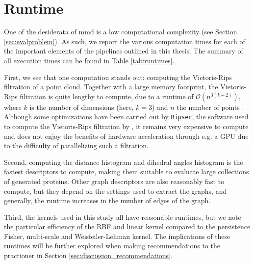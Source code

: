 \section{Runtime}\label{sec:results_runtime}

One of the desiderata of \acrshort{mmd} is a low computational complexity (see Section
\ref{sec:evalproblem}). As such, we report the various computation times for
each of the important elements of the pipelines outlined in this thesis. The
summary of all execution times can be found in Table \ref{tab:runtimes}.

First, we see that one computation stands out: computing the Vietoris-Rips
filtration of a point cloud. Together with a large memory footprint, the
Vietoris-Rips filtration is quite lengthy to compute, due to a runtime of
$\mathcal{O}(n^{3(k+2)})$, where $k$ is the number of dimensions (here, $k=3$)
and $n$ the number of points \citep{adams2018persistent}. Although some optimizations have been carried out
by \texttt{Ripser}, the software used to compute the Vietoris-Rips filtration by
\cite{Bauer2021Ripser},
it remains very expensive to compute and does not enjoy the benefits of hardware
acceleration through e.g. a GPU due to the difficulty of parallelizing such a
filtration.

Second, computing the distance histogram and dihedral angles histogram is the
fastest descriptors to compute, making them suitable to evaluate large
collections of generated proteins. Other graph descriptors are also reasonably
fast to compute, but they depend on the settings used to extract the graphs, and
generally, the runtime increases in the number of edges of the graph.

Third, the kernels used in this study all have reasonable runtimes, but we note
the particular efficiency of the RBF and linear kernel compared to the
persistence Fisher, multi-scale and Weisfeiler-Lehman kernel. The
implications of these runtimes will be further explored when making
recommendations to the practioner in Section
\ref{sec:discussion_recommendations}.


